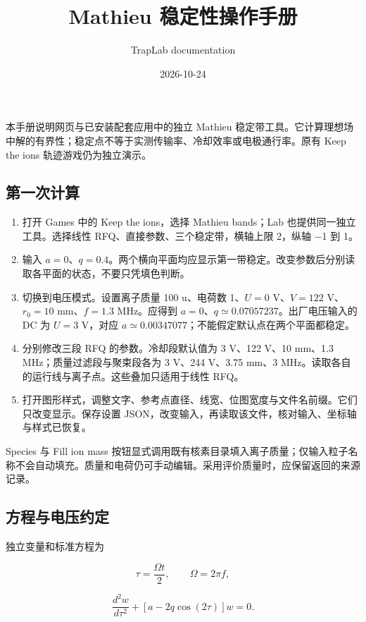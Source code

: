 \documentclass[
  aps,
  onecolumn,
  11pt]{revtex4-2}
\title{Mathieu 稳定性操作手册}
\author{TrapLab documentation}
\date{2026-10-24}
\providecommand{\tightlist}{%
  \setlength{\itemsep}{0pt}\setlength{\parskip}{0pt}}
\begin{document}
\maketitle

本手册说明网页与已安装配套应用中的独立 Mathieu
稳定带工具。它计算理想场中解的有界性；稳定点不等于实测传输率、冷却效率或电极通行率。原有
Keep the ions 轨迹游戏仍为独立演示。

\subsection{第一次计算}\label{ux7b2cux4e00ux6b21ux8ba1ux7b97}

\begin{enumerate}
\def\labelenumi{\arabic{enumi}.}
\tightlist
\item
  打开 Games 中的 Keep the ions，选择 Mathieu bands；Lab
  也提供同一独立工具。选择线性 RFQ、直接参数、三个稳定带，横轴上限
  2，纵轴 −1 到 1。
\item
  输入
  \(a=0\)、\(q=0.4\)。两个横向平面均应显示第一带稳定。改变参数后分别读取各平面的状态，不要只凭填色判断。
\item
  切换到电压模式。设置离子质量 100 u、电荷数 1、\(U=0\) V、\(V=122\)
  V、\(r_0=10\) mm、\(f=1.3\) MHz。应得到
  \(a=0\)、\(q\simeq0.07057237\)。出厂电压输入的 DC 为 \(U=3\) V，对应
  \(a\simeq0.00347077\)；不能假定默认点在两个平面都稳定。
\item
  分别修改三段 RFQ 的参数。冷却段默认值为 3 V、122 V、10 mm、1.3
  MHz；质量过滤段与聚束段各为 3 V、244 V、3.75 mm、3
  MHz。读取各自的运行线与离子点。这些叠加只适用于线性 RFQ。
\item
  打开图形样式，调整文字、参考点直径、线宽、位图宽度与文件名前缀。它们只改变显示。保存设置
  JSON，改变输入，再读取该文件，核对输入、坐标轴与样式已恢复。
\end{enumerate}

Species 与 Fill ion mass
按钮显式调用既有核素目录填入离子质量；仅输入粒子名称不会自动填充。质量和电荷仍可手动编辑。采用评价质量时，应保留返回的来源记录。

\subsection{方程与电压约定}\label{ux65b9ux7a0bux4e0eux7535ux538bux7ea6ux5b9a}

独立变量和标准方程为

\[\tau=\frac{\Omega t}{2},\qquad \Omega=2\pi f,\]

\[\frac{d^2w}{d\tau^2}+\left[a-2q\cos(2\tau)\right]w=0.\]
\end{document}
